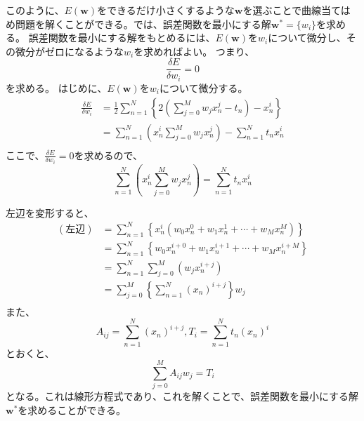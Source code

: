 \documentclass[a4paper,uplatex]{jsarticle}
\numberwithin{equation}{section}
\numberwithin{figure}{section}
\numberwithin{table}{section}
\begin{document}
このように、\(E(\bm{w})\)をできるだけ小さくするような\(\bm{w}\)を選ぶことで曲線当てはめ問題を解くことができる。では、誤差関数を最小にする解\(\bm{w^*}=\{w_i\}\)を求める。
誤差関数を最小にする解をもとめるには、\(E(\bm{w})\)を\(w_i\)について微分し、その微分がゼロになるような\(w_i\)を求めればよい。
つまり、
\begin{equation}
  \frac{\delta E}{\delta w_i} = 0
\end{equation}
を求める。
はじめに、\(E(\bm{w})\)を\(w_i\)について微分する。
\begin{align*}
  \frac{\delta E}{\delta w_i} &= \frac{1}{2}\sum_{n=1}^{N}\left\{2\left(\sum_{j=0}^{M}w_j x_n^j-t_n\right)-x_n^i\right\} \\
                              &= \sum_{n=1}^{N}\left(x_n^i\sum_{j=0}^{M}w_j x_n^j\right) - \sum_{n=1}^{N}t_n x_n^i \\
\end{align*}
ここで、\(\frac{\delta E}{\delta w_i} = 0\)を求めるので、
\begin{equation}
  \sum_{n=1}^{N}\left(x_n^i\sum_{j=0}^{M}w_j x_n^j\right) = \sum_{n=1}^{N}t_n x_n^i
\end{equation}

左辺を変形すると、
\begin{align*}
  (左辺) &= \sum_{n=1}^{N}\left\{x_n^i\left(w_0 x_n^0+w_1x_n^1+\cdots+w_Mx_n^M\right)\right\} \\
         &= \sum_{n=1}^{N}\left\{w_0x_n^{i+0}+w_1x_n^{i+1}+\cdots+w_Mx_n^{i+M}\right\} \\
         &= \sum_{n=1}^{N}\sum_{j=0}^{M}\left(w_jx_n^{i+j}\right) \\
         &= \sum_{j=0}^{M}\left\{\sum_{n=1}^{N}(x_n)^{i+j}\right\}w_j \\
\end{align*}
また、
\begin{equation}
  A_{ij} = \sum_{n=1}^{N}(x_n)^{i+j}, T_i = \sum_{n=1}^{N}t_n(x_n)^i
\end{equation}
とおくと、
\begin{equation}
  \sum_{j=0}^{M}A_{ij}w_j = T_i
\end{equation}
となる。これは線形方程式であり、これを解くことで、誤差関数を最小にする解\(\bm{w^*}\)を求めることができる。

\begin{figure}[htbp]
  \centering
  
\end{figure}
\end{document}
